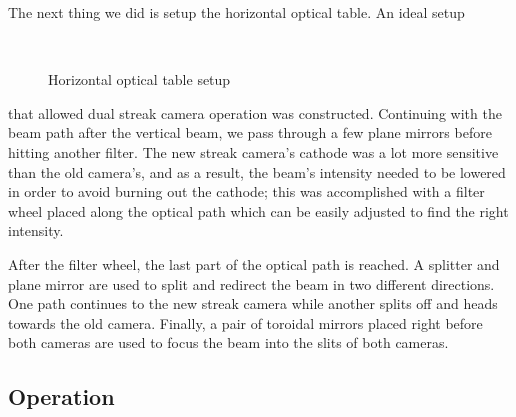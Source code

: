 \documentclass[%
 reprint,%
 amssymb, amsmath,%
 aip,cha,%
]{revtex4-1}
\begin{document}
The next thing we did is setup the horizontal optical table. An ideal setup
\begin{figure}[htb]
\begin{center}
 \\[0.5cm]
\caption{Horizontal optical table setup}
\label{hortable}
\end{center}
\end{figure}
that allowed dual streak camera operation was constructed. Continuing with the beam path after the vertical beam, we pass through a few plane mirrors before hitting another filter. The new streak camera's cathode was a lot more sensitive than the old camera's, and as a result, the beam's intensity needed to be lowered in order to avoid burning out the cathode; this was accomplished with a filter wheel placed along the optical path which can be easily adjusted to find the right intensity. 

After the filter wheel, the last part of the optical path is reached. A splitter and plane mirror are used to split and redirect the beam in two different directions. One path continues to the new streak camera while another splits off and heads towards the old camera. Finally, a pair of toroidal mirrors placed right before both cameras are used to focus the beam into the slits of both cameras.

\subsection{Operation}
\end{document}
